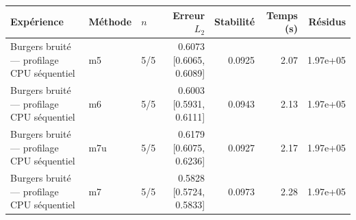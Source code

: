 \begin{tabular}{lllrrrr}
\toprule
Expérience & Méthode & $n$ & Erreur $L_2$ & Stabilité & Temps (s) & Résidus \\
\midrule
Burgers bruité — profilage CPU séquentiel & m5 & 5/5 & 0.6073 [0.6065, 0.6089] & 0.0925 & 2.07 & 1.97e+05 \\
Burgers bruité — profilage CPU séquentiel & m6 & 5/5 & 0.6003 [0.5931, 0.6111] & 0.0943 & 2.13 & 1.97e+05 \\
Burgers bruité — profilage CPU séquentiel & m7u & 5/5 & 0.6179 [0.6075, 0.6236] & 0.0927 & 2.17 & 1.97e+05 \\
Burgers bruité — profilage CPU séquentiel & m7 & 5/5 & 0.5828 [0.5724, 0.5833] & 0.0973 & 2.28 & 1.97e+05 \\
\bottomrule
\end{tabular}
